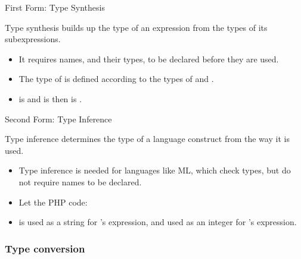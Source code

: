 \begin{bibunit}[apalike]
\begin{frame}{First Form: Type Synthesis}
	\begin{definition}
		Type synthesis builds up the type of an expression from the types of its subexpressions.
	\end{definition}
	\begin{itemize}
	\item It requires names, and their types, to be declared before they are used.
	\end{itemize}
	\vfill
	\begin{example}
		\begin{itemize}
		\item The type of  is defined according to the types of  and .
		\item {} is  and  is  then  is .
		\end{itemize}
	\end{example}
\end{frame}

\begin{frame}{Second Form: Type Inference}
	\begin{definition}
		Type inference determines the type of a language construct from the way it is used.
	\end{definition}
	\begin{itemize}
	\item Type inference is needed for languages like ML, which check types, but do not require names to be declared.
	\end{itemize}
	\vfill
	\begin{example}
		\begin{itemize}
		\item Let the PHP code: \code{\{ \$a = 14; \$b = \str{"a"} . \$a; \$c = 1 + \$a; \}}
		\item {} is used as a string for 's expression, and used as an integer for 's expression.
		\end{itemize}
	\end{example}
\end{frame}

\subsubsection{Type conversion}

\tableofcontentslide[sections={3-6},sectionstyle={show/shaded},subsectionstyle={show/shaded/hide},subsubsectionstyle={show/shaded/hide/hide}]


\end{bibunit}

